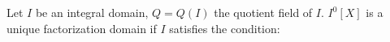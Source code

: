 Let $I$ be an integral domain, $Q = Q(I)$ the quotient field of $I$. $I^0[X]$ is a unique factorization domain if $I$ satisfies the condition:
